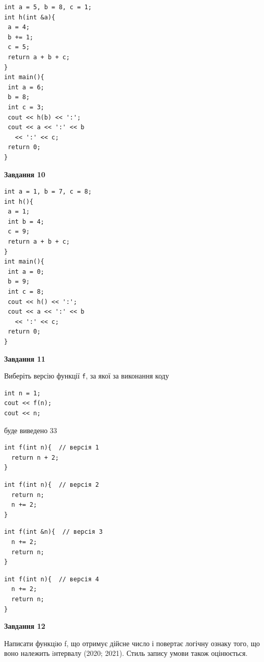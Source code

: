 \documentclass[12pt, ukrainian]{article}
\def\code#1{\Verb!#1!}
\begin{document}
{\begin {large}
\begin{minipage}[t]{7.0cm}
\begin{verbatim}
int a = 5, b = 8, c = 1;
int h(int &a){
 a = 4;
 b += 1;
 c = 5;
 return a + b + c;
}
int main(){
 int a = 6;
 b = 8;
 int c = 3;
 cout << h(b) << ':';
 cout << a << ':' << b 
   << ':' << c;
 return 0;
}
\end{verbatim}



\begin{center}
\textbf{Завдання 10}
\end{center}
\vspace{-8mm}

\begin{verbatim}
int a = 1, b = 7, c = 8;
int h(){
 a = 1;
 int b = 4;
 c = 9;
 return a + b + c;
}
int main(){
 int a = 0;
 b = 9;
 int c = 8;
 cout << h() << ':';
 cout << a << ':' << b 
   << ':' << c;
 return 0;
}
\end{verbatim}

\end{minipage}
\vline \hspace{1mm}
\begin{minipage}[t]{11.0cm}

\begin{center}
\textbf{Завдання 11}
\end{center}
Виберіть версію функції \code{f}, за якої за виконання коду
\begin{verbatim}
int n = 1;
cout << f(n);
cout << n;
\end{verbatim}

буде виведено 33

\begin{verbatim}
int f(int n){  // версія 1
  return n + 2;
}
\end{verbatim}

\vspace{-8mm}\begin{verbatim}
int f(int n){  // версія 2
  return n;
  n += 2;
}
\end{verbatim}

\vspace{-8mm}\begin{verbatim}
int f(int &n){  // версія 3
  n += 2;
  return n;
}
\end{verbatim}

\vspace{-8mm}\begin{verbatim}
int f(int n){  // версія 4
  n += 2;
  return n;
}
\end{verbatim}



\begin{center}
\textbf{Завдання 12}
\end{center}

Написати функцiю f, що отримує дійсне число і повертає логічну ознаку того, що воно належить iнтервалу (2020; 2021). Стиль запису умови також оцінюється.\par

\end{minipage}

\end {large}}
\newpage
\end{document}
